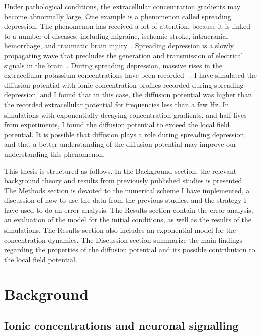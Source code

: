\documentclass{uiophd}
\begin{document}
Under pathological conditions, the extracellular concentration gradients may become abnormally large. One example is a phenomenon called spreading depression. The phenomenon has received a lot of attention, because it is linked to a number of diseases, including migraine, ischemic stroke, intracranial hemorrhage, and traumatic brain injury~\cite{Ataya2015}. Spreading depression is a slowly propagating wave that precludes the generation and transmission of electrical signals in the brain~\cite{Ataya2015}. During spreading depression, massive rises in the extracellular potassium concentrations have been recorded ~\cite{Ataya2015}\cite{Herreras1993}. I have simulated the diffusion potential with ionic concentration profiles recorded during spreading depression, and I found that in this case, the diffusion potential was higher than the recorded extracellular potential for frequencies less than a few Hz. In simulations with exponentially decaying concentration gradients, and half-lives from experiments, I found the diffusion potential to exceed the local field potential. It is possible that diffusion plays a role during spreading depression, and that a better understanding of the diffusion potential may improve our understanding this phenomenon.




This thesis is structured as follows. In the Background section, the relevant background theory and results from previously published studies is presented. The Methods section is devoted to the numerical scheme I have implemented, a discussion of how to use the data from the previous studies, and the strategy I have used to do an error analysis. The Results section contain the error analysis, an evaluation of the model for the initial conditions, as well as the results of the simulations. The Results section also includes an exponential model for the concentration dynamics. The Discussion section summarize the main findings regarding the properties of the diffusion potential and its possible contribution to the local field potential. 



\chapter{Background}


\section{Ionic concentrations and neuronal signalling}\label{APs,neuronal membrane, el.neutrality}
\end{document}
